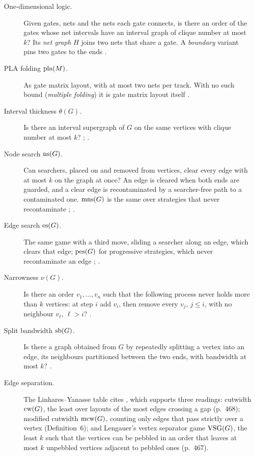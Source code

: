 \begin{description}
\item[One-dimensional logic.] Given gates, nets and the nets each gate connects,
  is there an order of the gates whose net intervals have an interval graph of
  clique number at most $k$? Its \emph{net graph} $H$ joins two nets that
  share a gate. A \emph{boundary} variant pins two gates to the ends
  \citep[\S\S II--IV]{LY2002ref7}.
\item[PLA folding $\mathrm{pla}(M)$.] As gate matrix layout, with at most two nets per
  track. With no such bound (\emph{multiple folding}) it is gate matrix layout
  itself \citep[pp.~25, 36]{LY2002ref6}.
\item[Interval thickness $\theta(G)$.] Is there an interval supergraph of $G$ on
  the same vertices with clique number at most $k$?
  \citep[p.~182]{LY2002ref9}; \citep[p.~31]{LY2002ref6}.
\item[Node search $\mathrm{ns}(G)$.] Can searchers, placed on and removed from vertices,
  clear every edge with at most $k$ on the graph at once? An edge is cleared
  when both ends are guarded, and a clear edge is recontaminated by a
  searcher-free path to a contaminated one. $\mathrm{mns}(G)$ is the same over strategies
  that never recontaminate \citep[p.~181]{LY2002ref9}; \citep[\S2]{LY2002ref10}.
\item[Edge search $\mathrm{es}(G)$.] The same game with a third move, sliding a searcher
  along an edge, which clears that edge; $\mathrm{pes}(G)$ for progressive strategies,
  which never recontaminate an edge
  \citep[p.~208]{LY2002ref10}; \citep[p.~53]{EllisSudboroughTurner1994}.
\item[Narrowness $\nu(G)$.] Is there an order $v_1,\dots,v_n$ such that the
  following process never holds more than $k$ vertices: at step $i$ add $v_i$,
  then remove every $v_j$, $j\le i$, with no neighbour $v_\ell$, $\ell>i$?
  \citep[\S2]{LY2002ref11}.
\item[Split bandwidth $\mathrm{sb}(G)$.] Is there a graph obtained from $G$ by
  repeatedly splitting a vertex into an edge, its neighbours partitioned between
  the two ends, with bandwidth at most $k$? \citep[\S3.2]{LY2002ref12}.
\item[Edge separation.] The Linhares--Yanasse table cites \citet{LY2002ref14},
  which supports three
  readings: cutwidth $\mathrm{cw}(G)$, the least over layouts of the most edges crossing
  a gap (p.~468); modified cutwidth $\mathrm{mcw}(G)$, counting only edges that pass
  strictly over a vertex (Definition~6); and Lengauer's vertex separator game
  $\mathrm{VSG}(G)$, the least $k$ such that the vertices can be pebbled in an order that
  leaves at most $k$ unpebbled vertices adjacent to pebbled ones (p.~467).
\end{description}


